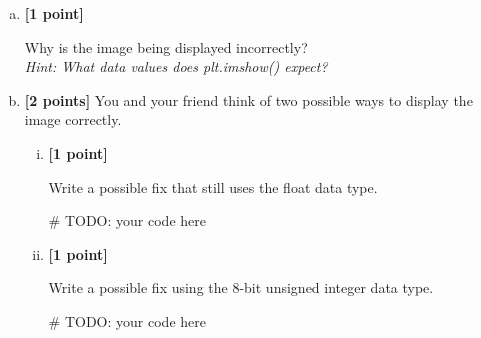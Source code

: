 \documentclass[11pt]{article}
\begin{document}
\begin{enumerate} [(a)]
    \item \textbf{[1 point]}
\begin{tcolorbox}[colback=orange!5!white,colframe=orange!75!black]
Why is the image being displayed incorrectly?\\
\emph{Hint: What data values does plt.imshow() expect?}
\end{tcolorbox}

\begin{tcolorbox}[colback=white!5!white,colframe=green!75!black, height=3cm]
    


\end{tcolorbox}

\item \textbf{[2 points]} You and your friend think of two possible ways to display the image correctly.
\begin{enumerate} [(i)]

\item \textbf{[1 point]}
\begin{tcolorbox}[colback=orange!5!white,colframe=orange!75!black]
Write a possible fix that still uses the float data type.
\end{tcolorbox}

\begin{tcolorbox}[colback=white!5!white,colframe=green!75!black, height=4cm]

    \begin{python}
    # TODO: your code here
    \end{python}
\end{tcolorbox}


\pagebreak
\item \textbf{[1 point]}
\begin{tcolorbox}[colback=orange!5!white,colframe=orange!75!black]
Write a possible fix using the 8-bit unsigned integer data type.
\end{tcolorbox}

\begin{tcolorbox}[colback=white!5!white,colframe=green!75!black, height=4cm]
    \begin{python}
    # TODO: your code here
    \end{python}
\end{tcolorbox}
\end{enumerate}


\end{enumerate}
\end{document}
